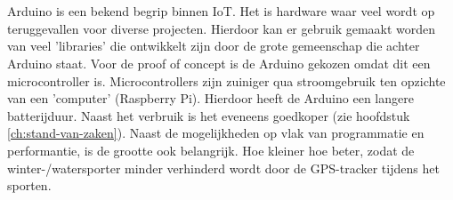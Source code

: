 \chapter{}
\label{ch:corpus}

\section{}
\label{ch:proof-of-concept}
Arduino is een bekend begrip binnen IoT. Het is hardware waar veel wordt op teruggevallen voor diverse projecten. Hierdoor kan er gebruik gemaakt worden van veel 'libraries' die ontwikkelt zijn door de grote gemeenschap die achter Arduino staat. 
\newline
Voor de proof of concept is de Arduino gekozen omdat dit een microcontroller is. Microcontrollers zijn zuiniger qua stroomgebruik ten opzichte van een 'computer' (Raspberry Pi). Hierdoor heeft de Arduino een langere batterijduur. Naast het verbruik is het eveneens goedkoper (zie hoofdstuk \ref{ch:stand-van-zaken}).
\newline
Naast de mogelijkheden op vlak van programmatie en performantie, is de grootte ook belangrijk. Hoe kleiner hoe beter, zodat de winter-/watersporter minder verhinderd wordt door de GPS-tracker tijdens het sporten.
\newline
